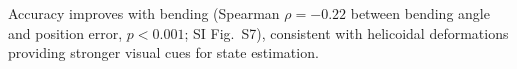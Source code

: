 Accuracy improves with bending (Spearman $\rho = -0.22$ between bending angle and position error, $p < 0.001$; SI Fig.~S7), consistent with helicoidal deformations providing stronger visual cues for state estimation.
